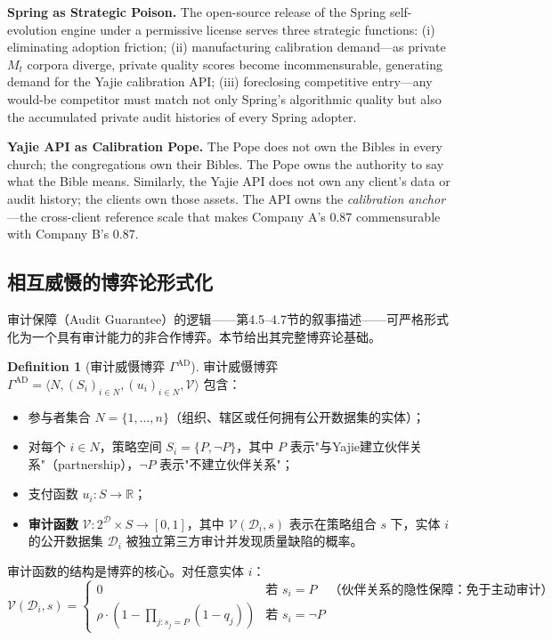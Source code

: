 \documentclass[12pt,a4paper]{ctexart}
\theoremstyle{definition}
\newtheorem{definition}{Definition}[section]
\theoremstyle{remark}
\begin{document}
\textbf{Spring as Strategic Poison.} The open-source release of the Spring self-evolution engine under a permissive license serves three strategic functions: (i) eliminating adoption friction; (ii) manufacturing calibration demand—as private $M_t$ corpora diverge, private quality scores become incommensurable, generating demand for the Yajie calibration API; (iii) foreclosing competitive entry—any would-be competitor must match not only Spring's algorithmic quality but also the accumulated private audit histories of every Spring adopter.

\textbf{Yajie API as Calibration Pope.} The Pope does not own the Bibles in every church; the congregations own their Bibles. The Pope owns the authority to say what the Bible means. Similarly, the Yajie API does not own any client's data or audit history; the clients own those assets. The API owns the \textit{calibration anchor}—the cross-client reference scale that makes Company A's 0.87 commensurable with Company B's 0.87.

\subsection{相互威慑的博弈论形式化}

审计保障（Audit Guarantee）的逻辑——第4.5--4.7节的叙事描述——可严格形式化为一个具有审计能力的非合作博弈。本节给出其完整博弈论基础。

\begin{definition}[审计威慑博弈 $\Gamma^{\text{AD}}$]
\label{def:audit-deterrence-game}
审计威慑博弈 $\Gamma^{\text{AD}} = \langle N, (S_i)_{i \in N}, (u_i)_{i \in N}, \mathcal{V} \rangle$ 包含：
\begin{itemize}[itemsep=2pt]
\item 参与者集合 $N = \{1, \ldots, n\}$（组织、辖区或任何拥有公开数据集的实体）；
\item 对每个 $i \in N$，策略空间 $S_i = \{P, \neg P\}$，其中 $P$ 表示"与Yajie建立伙伴关系"（partnership），$\neg P$ 表示"不建立伙伴关系"；
\item 支付函数 $u_i: S \to \mathbb{R}$；
\item \textbf{审计函数} $\mathcal{V}: 2^{\mathcal{D}} \times S \to [0,1]$，其中 $\mathcal{V}(\mathcal{D}_i, s)$ 表示在策略组合 $s$ 下，实体 $i$ 的公开数据集 $\mathcal{D}_i$ 被独立第三方审计并发现质量缺陷的概率。
\end{itemize}
\end{definition}

审计函数的结构是博弈的核心。对任意实体 $i$：
\begin{equation}
\mathcal{V}(\mathcal{D}_i, s) =
\begin{cases}
0 & \text{若 } s_i = P \quad \text{（伙伴关系的隐性保障：免于主动审计）}\\
\rho \cdot \left(1 - \prod_{j: s_j = P} (1 - q_j)\right) & \text{若 } s_i = \neg P
\end{cases}
\label{eq:audit-function}
\end{equation}
\end{document}
